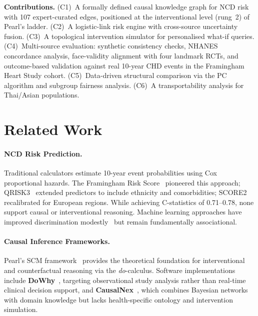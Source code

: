 \documentclass[runningheads]{llncs}
\begin{document}
\noindent\textbf{Contributions.}
(C1)~A formally defined causal knowledge graph for NCD risk with 107
expert-curated edges, positioned at the interventional level (rung~2)
of Pearl's ladder.
(C2)~A logistic-link risk engine with cross-source uncertainty fusion.
(C3)~A topological intervention simulator for personalised what-if queries.
(C4)~Multi-source evaluation: synthetic consistency checks, NHANES
concordance analysis, face-validity alignment with four landmark RCTs,
and outcome-based validation against real 10-year CHD events in the
Framingham Heart Study cohort.
(C5)~Data-driven structural comparison via the PC algorithm and subgroup
fairness analysis.
(C6)~A transportability analysis for Thai/Asian populations.

\section{Related Work}\label{sec:related}

\paragraph{NCD Risk Prediction.}
Traditional calculators estimate 10-year event probabilities using Cox
proportional hazards.  The Framingham Risk
Score~\cite{dagostino2008} pioneered this approach;
QRISK3~\cite{hippisley2017qrisk3} extended predictors to include
ethnicity and comorbidities; SCORE2~\cite{score22021} recalibrated
for European regions.  While achieving C-statistics of 0.71--0.78,
none support causal or interventional reasoning.  Machine learning
approaches have improved discrimination
modestly~\cite{alaa2019attentive} but remain fundamentally
associational.

\paragraph{Causal Inference Frameworks.}
Pearl's SCM framework~\cite{pearl2009causality} provides the
theoretical foundation for interventional and counterfactual reasoning
via the \emph{do}-calculus.  Software implementations include
\textbf{DoWhy}~\cite{sharma2020dowhy}, targeting observational study
analysis rather than real-time clinical decision support, and
\textbf{CausalNex}~\cite{beaumont2021causalnex}, which combines
Bayesian networks with domain knowledge but lacks health-specific
ontology and intervention simulation.
\end{document}
